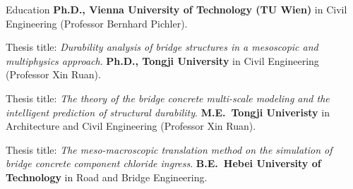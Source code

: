\begin{rubric}{Education}
%
	\textbf{Ph.D., Vienna University of Technology (TU Wien)} in Civil Engineering (Professor Bernhard Pichler).
	\par Thesis title: \emph{Durability analysis of bridge structures in a mesoscopic and multiphysics approach}.
% 
%
	\textbf{Ph.D., Tongji University} in Civil Engineering (Professor Xin Ruan).
	\par Thesis title: \emph{The theory of the bridge concrete multi-scale modeling and the intelligent prediction of structural durability}.
%
\entry*[2016 -- 2018]%
	\textbf{M.E.~Tongji Univeristy} in Architecture and Civil Engineering  (Professor Xin Ruan).\par
	Thesis title: \emph{The meso-macroscopic translation method on the simulation of bridge concrete component chloride ingress}.
% 
\entry*[2012 -- 2016]%
	\textbf{B.E.~Hebei University of Technology} in Road and Bridge Engineering.\par
\end{rubric}